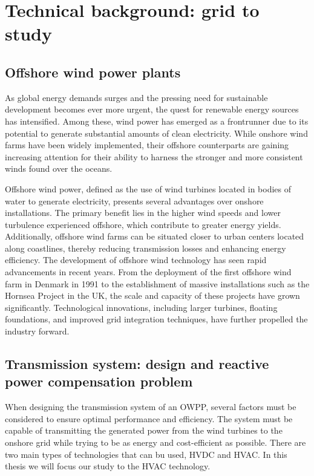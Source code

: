 \documentclass[a4paper,11pt, titlepage, twoside]{article}
\begin{document}
\section{Technical background: grid to study}\label{Grid}

\subsection{Offshore wind power plants}
As global energy demands surges and the pressing need for sustainable development becomes ever more urgent, 
the quest for renewable energy sources has intensified. Among these, wind power has emerged as a frontrunner due to its potential to generate substantial amounts of clean electricity.
While onshore wind farms have been widely implemented, their offshore counterparts are gaining increasing attention for their ability to harness the stronger and more consistent winds found over the oceans.\par

Offshore wind power, defined as the use of wind turbines located in bodies of water to generate electricity, presents several advantages over onshore installations. The primary benefit lies in the higher wind speeds
and lower turbulence experienced offshore, which contribute to greater energy yields. Additionally, offshore wind farms can be situated closer to urban centers located along coastlines, thereby reducing transmission
losses and enhancing energy efficiency. The development of offshore wind technology has seen rapid advancements in recent years. From the deployment of the first offshore wind farm in Denmark in 1991 to the establishment
of massive installations such as the Hornsea Project in the UK, the scale and capacity of these projects have grown significantly. Technological innovations, including larger turbines, floating foundations, and improved
grid integration techniques, have further propelled the industry forward.

\subsection{Transmission system: design and reactive power compensation problem}\label{reactpowpresetation}

When designing the transmission system of an OWPP, several factors must be considered to ensure optimal performance and efficiency. The system must be capable of transmitting the generated power from the wind turbines to the onshore grid
while trying to be as energy and cost-efficient as possible. There are two main types of technologies that can bu used, HVDC and HVAC. In this thesis we will focus our study to the HVAC technology.\par
\end{document}
